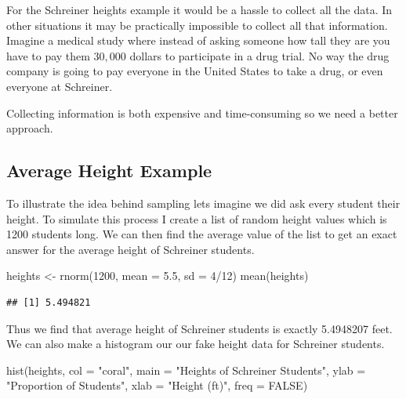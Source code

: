 \documentclass[
]{book}
\newenvironment{Shaded}{\begin{snugshade}}{\end{snugshade}}
\newcommand{\AttributeTok}[1]{\textcolor[rgb]{0.77,0.63,0.00}{#1}}
\newcommand{\ConstantTok}[1]{\textcolor[rgb]{0.00,0.00,0.00}{#1}}
\newcommand{\DecValTok}[1]{\textcolor[rgb]{0.00,0.00,0.81}{#1}}
\newcommand{\FloatTok}[1]{\textcolor[rgb]{0.00,0.00,0.81}{#1}}
\newcommand{\FunctionTok}[1]{\textcolor[rgb]{0.00,0.00,0.00}{#1}}
\newcommand{\NormalTok}[1]{#1}
\newcommand{\OtherTok}[1]{\textcolor[rgb]{0.56,0.35,0.01}{#1}}
\newcommand{\SpecialCharTok}[1]{\textcolor[rgb]{0.00,0.00,0.00}{#1}}
\newcommand{\StringTok}[1]{\textcolor[rgb]{0.31,0.60,0.02}{#1}}
\theoremstyle{definition}
\theoremstyle{definition}
\theoremstyle{definition}
\theoremstyle{definition}
\theoremstyle{remark}
\begin{document}
For the Schreiner heights example it would be a hassle to collect all the data. In other situations it may be practically impossible to collect all that information. Imagine a medical study where instead of asking someone how tall they are you have to pay them \(30,000\) dollars to participate in a drug trial. No way the drug company is going to pay everyone in the United States to take a drug, or even everyone at Schreiner.

Collecting information is both expensive and time-consuming so we need a better approach.

\hypertarget{average-height-example}{%
\subsection{Average Height Example}\label{average-height-example}}

To illustrate the idea behind sampling lets imagine we did ask every student their height. To simulate this process I create a list of random height values which is 1200 students long. We can then find the average value of the list to get an exact answer for the average height of Schreiner students.

\begin{Shaded}
\begin{Highlighting}[]
\NormalTok{heights }\OtherTok{\textless{}{-}} \FunctionTok{rnorm}\NormalTok{(}\DecValTok{1200}\NormalTok{, }\AttributeTok{mean =} \FloatTok{5.5}\NormalTok{, }\AttributeTok{sd =} \DecValTok{4}\SpecialCharTok{/}\DecValTok{12}\NormalTok{)}
\FunctionTok{mean}\NormalTok{(heights)}
\end{Highlighting}
\end{Shaded}

\begin{verbatim}
## [1] 5.494821
\end{verbatim}

Thus we find that average height of Schreiner students is exactly 5.4948207 feet. We can also make a histogram our our fake height data for Schreiner students.

\begin{Shaded}
\begin{Highlighting}[]
\FunctionTok{hist}\NormalTok{(heights, }\AttributeTok{col =} \StringTok{"coral"}\NormalTok{, }\AttributeTok{main =} \StringTok{"Heights of Schreiner Students"}\NormalTok{, }\AttributeTok{ylab =} \StringTok{"Proportion of Students"}\NormalTok{,}
    \AttributeTok{xlab =} \StringTok{"Height (ft)"}\NormalTok{, }\AttributeTok{freq =} \ConstantTok{FALSE}\NormalTok{)}
\end{Highlighting}
\end{Shaded}
\end{document}
